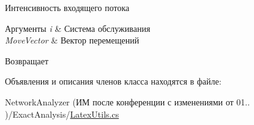 Интенсивность входящего потока 


\begin{DoxyParams}{Аргументы}
{\em i} & Система обслуживания\\
\hline
{\em Move\+Vector} & Вектор перемещений\\
\hline
\end{DoxyParams}
\begin{DoxyReturn}{Возвращает}

\end{DoxyReturn}


Объявления и описания членов класса находятся в файле\+:\begin{DoxyCompactItemize}
\item 
Network\+Analyzer (ИМ после конференции  с изменениями от 01.. )/\+Exact\+Analysis/\hyperlink{_latex_utils_8cs}{Latex\+Utils.\+cs}\end{DoxyCompactItemize}
